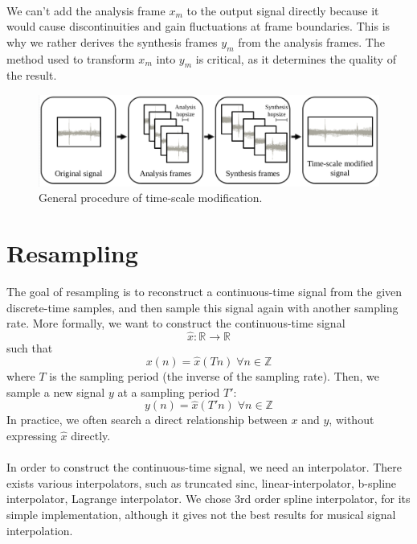 \documentclass[letterpaper]{article}
\begin{document}
\paragraph{}
We can't add the analysis frame \(x_m\) to the output signal directly because it
would cause discontinuities and gain fluctuations at frame boundaries. This is
why we rather derives the synthesis frames \(y_m\) from the analysis frames.
The method used to transform \(x_m\) into \(y_m\) is
critical, as it determines the quality of the result.
\begin{figure}
\includegraphics[width=\textwidth]{pipeline.png}
\caption{General procedure of time-scale modification.}
\end{figure}

\section{Resampling}
The goal of resampling is to reconstruct a continuous-time signal from the given
discrete-time samples, and then sample this signal again with another sampling
rate. More formally, we want to construct the continuous-time signal
\[\hat x:\mathbb{R}\to\mathbb{R}\]
such that
\[x(n) = \hat x(Tn) \;\forall n\in\mathbb{Z}\]
where \(T\) is the sampling period (the inverse of the sampling rate). Then, we
sample a new signal \(y\) at a sampling period \(T'\):
\[y(n) = \hat x(T'n) \;\forall n\in\mathbb{Z}\]
In practice, we often search a direct relationship between \(x\) and \(y\),
without expressing \(\hat x\) directly.
\paragraph{}
In order to construct the continuous-time signal, we need an interpolator. There
exists various interpolators, such as truncated sinc, linear-interpolator,
b-spline interpolator, Lagrange interpolator. We chose 3rd order spline
interpolator, for its simple implementation, although it gives not the best
results for musical signal interpolation.
\end{document}
